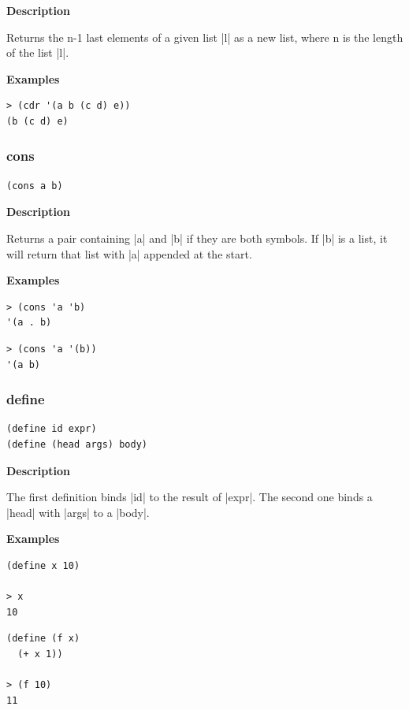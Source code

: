 \documentclass[a4paper]{article}
\begin{document}
\textbf{Description}

Returns the n-1 last elements of a given list |l| as a new list, where n is the length of the list |l|.

\textbf{Examples}

\begin{lstlisting}
> (cdr '(a b (c d) e))
(b (c d) e)
\end{lstlisting}

\subsubsection{cons}

\begin{lstlisting}[frame=none]
(cons a b)
\end{lstlisting}

\textbf{Description}

Returns a pair containing |a| and |b| if they are both symbols. If |b| is a list, it will return that list with |a| appended at the start.

\textbf{Examples}

\begin{lstlisting}
> (cons 'a 'b)
'(a . b)
\end{lstlisting}

\begin{lstlisting}
> (cons 'a '(b))
'(a b)
\end{lstlisting}

\subsubsection{define}

\begin{lstlisting}[frame=none]
(define id expr)
(define (head args) body)
\end{lstlisting}

\textbf{Description}

The first definition binds |id| to the result of |expr|. The second one binds a |head| with |args| to a |body|.

\textbf{Examples}

\begin{lstlisting}
(define x 10)

> x
10
\end{lstlisting}

\begin{lstlisting}
(define (f x)
  (+ x 1))
  
> (f 10)
11
\end{lstlisting}
\end{document}
